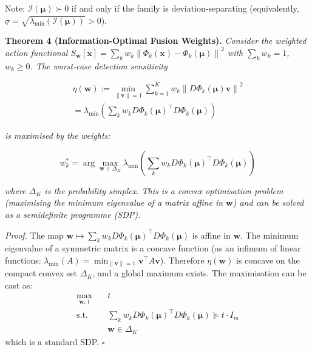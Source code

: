 \documentclass[journal]{IEEEtran}
\newcommand{\norm}[1]{\left\lVert#1\right\rVert}
\begin{document}
Note: $\mathcal{I}(\boldsymbol{\mu}) \succ 0$ if and only if the family is deviation-separating (equivalently, $\underline{\sigma} = \sqrt{\lambda_{\min}(\mathcal{I}(\boldsymbol{\mu}))} > 0$).

\vspace{0.5em}

\textbf{Theorem 4 (Information-Optimal Fusion Weights).} \textit{Consider the weighted action functional $S_{\mathbf{w}}[\mathbf{x}] = \sum_k w_k \norm{\Phi_k(\mathbf{x}) - \Phi_k(\boldsymbol{\mu})}^2$ with $\sum_k w_k = 1$, $w_k \geq 0$. The worst-case detection sensitivity}

\begin{multline}
\eta(\mathbf{w}) := \min_{\norm{\mathbf{v}}=1} \sum_{k=1}^K w_k \norm{D\Phi_k(\boldsymbol{\mu})\mathbf{v}}^2 \\
  = \lambda_{\min}\!\left(\sum_k w_k D\Phi_k(\boldsymbol{\mu})^\top D\Phi_k(\boldsymbol{\mu})\right)
\label{eq:sensitivity}
\end{multline}

\textit{is maximised by the weights:}

\begin{equation}
w_k^* = \arg\max_{\mathbf{w} \in \Delta_K} \lambda_{\min}\!\left(\textstyle\sum_k w_k D\Phi_k(\boldsymbol{\mu})^\top D\Phi_k(\boldsymbol{\mu})\right)
\label{eq:optimal_weights}
\end{equation}

\textit{where $\Delta_K$ is the probability simplex. This is a convex optimisation problem (maximising the minimum eigenvalue of a matrix affine in $\mathbf{w}$) and can be solved as a semidefinite programme (SDP).}

\textit{Proof.} The map $\mathbf{w} \mapsto \sum_k w_k D\Phi_k(\boldsymbol{\mu})^\top D\Phi_k(\boldsymbol{\mu})$ is affine in $\mathbf{w}$. The minimum eigenvalue of a symmetric matrix is a concave function (as an infimum of linear functions: $\lambda_{\min}(A) = \min_{\norm{\mathbf{v}}=1} \mathbf{v}^\top A \mathbf{v}$). Therefore $\eta(\mathbf{w})$ is concave on the compact convex set $\Delta_K$, and a global maximum exists. The maximisation can be cast as:
\begin{align*}
\max_{\mathbf{w},\, t} \quad & t \\
\text{s.t.} \quad & \textstyle\sum_k w_k D\Phi_k(\boldsymbol{\mu})^\top D\Phi_k(\boldsymbol{\mu}) \succeq t \cdot I_m \\
& \mathbf{w} \in \Delta_K
\end{align*}
which is a standard SDP. $\square$
\end{document}
